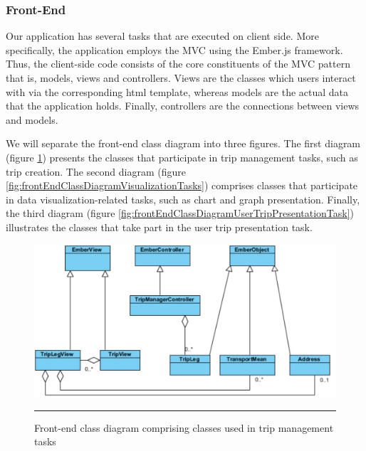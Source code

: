 \subsubsection{Front-End}

Our application has several tasks that are executed on client side. More specifically, the application employs the MVC using the Ember.js framework. Thus, the client-side code consists of the core constituents of the MVC pattern that is, models, views and controllers. Views are the classes which users interact with via the corresponding html template, whereas models are the actual data that the application holds. Finally, controllers are the connections between views and models.

We will separate the front-end class diagram into three figures. The first diagram (figure \ref{fig:frontEndClassDiagramTripManagement}) presents the classes that participate in trip management tasks, such as trip creation. The second diagram (figure \ref{fig:frontEndClassDiagramVisualizationTasks}) comprises classes that participate in data visualization-related tasks, such as chart and graph presentation. Finally, the third diagram (figure \ref{fig:frontEndClassDiagramUserTripPresentationTask}) illustrates the classes that take part in the user trip presentation task.


\begin{figure}[htbp]
	\centering
		\includegraphics[scale=0.70]{./Figures/chapter4/figure7.pdf}
		\rule{35em}{0.5pt}
	\caption[Front-end class diagram comprising classes used in trip management tasks]{Front-end class diagram comprising classes used in trip management tasks}
	\label{fig:frontEndClassDiagramTripManagement}
\end{figure}

